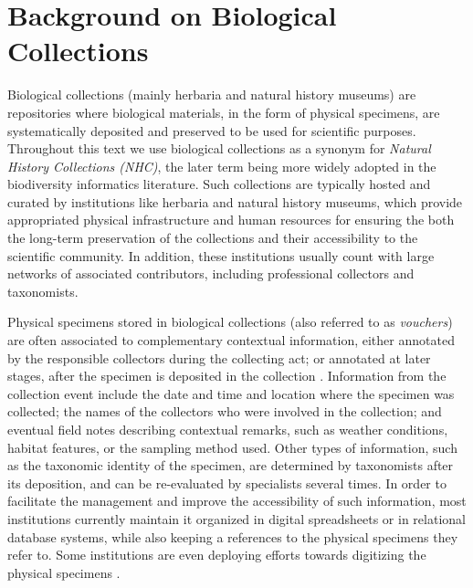 \chapter{Background on Biological Collections}\label{biodiversity_data}



Biological collections (mainly herbaria and natural history museums) are repositories where biological materials, in the form of physical specimens, are systematically deposited and preserved to be used for scientific purposes. 
Throughout this text we use biological collections as a synonym for \textit{Natural History Collections (NHC)}, the later term being more widely adopted in the biodiversity informatics literature.
Such collections are typically hosted and curated by institutions like herbaria and natural history museums, which provide appropriated physical infrastructure and human resources for ensuring the both the long-term preservation of the collections and their accessibility to the scientific community.
In addition, these institutions usually count with large networks of associated contributors, including professional collectors and taxonomists.

Physical specimens stored in biological collections (also referred to as \textit{vouchers}) are often associated to complementary contextual information, either annotated by the responsible collectors during the collecting act; or annotated at later stages, after the specimen is deposited in the collection \cite{Chapman2005}. %
Information from the collection event include the date and time and location where the specimen was collected; the names of the collectors who were involved in the collection; and eventual field notes describing contextual remarks, such as weather conditions, habitat features, or the sampling method used.
Other types of information, such as the taxonomic identity of the specimen, are determined by taxonomists after its deposition, and can be re-evaluated by specialists several times.
In order to facilitate the management and improve the accessibility of such information, most institutions currently maintain it organized in digital spreadsheets or in relational database systems, while also keeping a references to the physical specimens they refer to.
Some institutions are even deploying efforts towards digitizing the physical specimens \cite{}.

